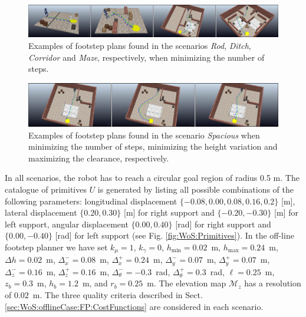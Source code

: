 \begin{figure}
    \centering
    \includegraphics[width=\textwidth]{figures/ExampleResults.png}
    \caption{Examples of footstep plans found in the scenarios \textit{Rod}, \textit{Ditch}, \textit{Corridor} and \textit{Maze}, respectively, when minimizing the number of steps.}
    \label{fig:WoS:ExampleResults}
\end{figure}
\begin{figure}
    \centering
    \includegraphics[width=\textwidth]{figures/ExampleResultsCompare.png}
    \caption{Examples of footstep plans found in the scenario \textit{Spacious} when minimizing the number of steps, minimizing the height variation and maximizing the clearance, respectively.}
    \label{fig:WoS:ExampleResultsCompare}
\end{figure}

In all scenarios, the robot has to reach a circular goal region of radius 0.5 m.
The catalogue of primitives $U$ is generated by listing all possible
combinations of the following parameters: longitudinal displacement
$\{-0.08,0.00,0.08,0.16,0.2\}$ [m], lateral displacement $\{0.20,0.30\}$ [m]
for right support and $\{-0.20,-0.30\}$ [m] for left support, angular
displacement $\{0.00,0.40\}$ [rad] for right support and $\{0.00,-0.40\}$ [rad]
for left support (see Fig. \ref{fig:WoS:Primitives}).
In the off-line footstep planner we have set
$k_{\mu} = 1$, $k_{\gamma} = 0$, $h_{\min} = 0.02$~m, $h_{\max} = 0.24$~m,
$\Delta h = 0.02$~m, $\Delta_x^- = 0.08$~m, $\Delta_x^+ = 0.24$~m,
$\Delta_y^-=0.07$~m, $\Delta_y^+=0.07$~m, $\Delta_z^-=0.16$~m,
$\Delta_z^+=0.16$~m, $\Delta_\theta^-=-0.3$~rad, $\Delta_\theta^+=0.3$~rad,
$\ell = 0.25$~m, $z_b=0.3$~m, $h_b=1.2$~m, and $r_b=0.25$~m.
The elevation map $\mathcal{M}_z$ has a resolution of $0.02$~m.
The three quality criteria described in
Sect. \ref{sec:WoS:offlineCase:FP:CostFunctions} are considered in each scenario.

